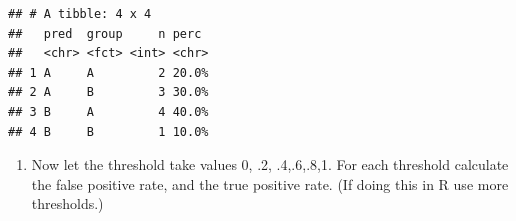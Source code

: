 \documentclass[]{article}
\newenvironment{Shaded}{\begin{snugshade}}{\end{snugshade}}
\newcommand{\CommentTok}[1]{\textcolor[rgb]{0.56,0.35,0.01}{\textit{#1}}}
\newcommand{\DataTypeTok}[1]{\textcolor[rgb]{0.13,0.29,0.53}{#1}}
\newcommand{\KeywordTok}[1]{\textcolor[rgb]{0.13,0.29,0.53}{\textbf{#1}}}
\newcommand{\NormalTok}[1]{#1}
\newcommand{\OperatorTok}[1]{\textcolor[rgb]{0.81,0.36,0.00}{\textbf{#1}}}
\newcommand{\StringTok}[1]{\textcolor[rgb]{0.31,0.60,0.02}{#1}}
\providecommand{\tightlist}{%
  \setlength{\itemsep}{0pt}\setlength{\parskip}{0pt}}
\begin{document}
\begin{Shaded}
\end{Shaded}

\begin{verbatim}
## # A tibble: 4 x 4
##   pred  group     n perc 
##   <chr> <fct> <int> <chr>
## 1 A     A         2 20.0%
## 2 A     B         3 30.0%
## 3 B     A         4 40.0%
## 4 B     B         1 10.0%
\end{verbatim}

\begin{Shaded}
\end{Shaded}

\begin{enumerate}
\def\labelenumi{(\alph{enumi})}
\setcounter{enumi}{2}
\tightlist
\item
  Now let the threshold take values 0, .2, .4,.6,.8,1. For each
  threshold calculate the false positive rate, and the true positive
  rate. (If doing this in R use more thresholds.)
\end{enumerate}
\end{document}
